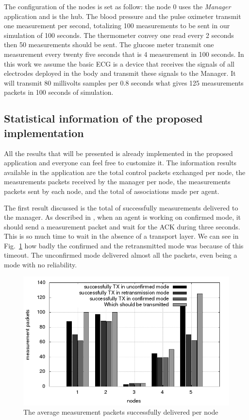 The configuration of the nodes is set as follow: the node 0 uses the \textit{Manager} application and is the hub. The blood pressure and the pulse oximeter transmit one measurement per second, totalizing 100 measurements to be sent in our simulation of 100 seconds. The thermometer convey one read every 2 seconds then 50 measurements should be sent. The glucose meter  transmit one measurement every twenty five seconds that is 4 measurement in 100 seconds. In this work we assume the basic ECG is a device that receives the signals of all electrodes deployed in the body and transmit these signals to the Manager. It will transmit 80 millivolts samples per 0.8 seconds what gives 125 measurements packets in 100 seconds of simulation.

\subsection{Statistical information of the proposed implementation}

All the results that will be presented is already implemented in the proposed application and everyone can feel free to customize it. The information results available in the application are the total control packets exchanged per node, the measurements packets received by the manager per node, the measurements packets sent by each node, and the total of associations made per agent. 

The first result discussed is the total of successfully measurements delivered to the manager. As described in \cite{b1}, when an agent is working on confirmed mode, it  should send a measurement packet and wait for the ACK during three seconds. This is so much time to wait in the absence of a transport layer. We can see in Fig.~\ref{fig:measurementreceivedpernode} how badly the confirmed and the retransmitted mode was because of this timeout. The unconfirmed mode delivered almost all the packets, even being a mode with no reliability.

\begin{figure}[htbp]
\centerline{\includegraphics[scale=0.4]{figures/averagemeasurementpacketreceivedpernode.png}}
\caption{The average measurement packets successfully delivered per node}
\label{fig:measurementreceivedpernode}
\end{figure}

